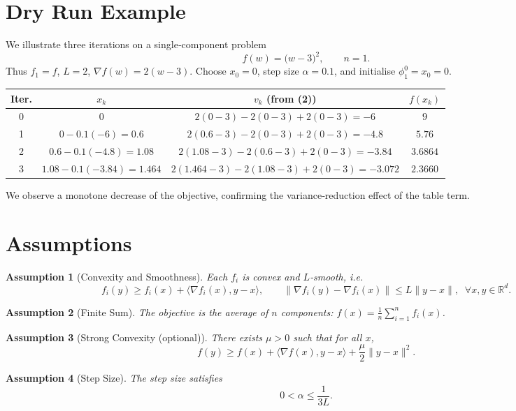 \documentclass[11pt]{article}
\newtheorem{assumption}{Assumption}
\newcommand{\R}{\mathbb{R}}
\begin{document}
\section*{Dry Run Example}
We illustrate three iterations on a single‑component problem 
\[
f(w)=\bigl(w-3\bigr)^{2},\qquad n=1.
\]
Thus $f_{1}=f$, $L=2$, $\nabla f(w)=2(w-3)$.  
Choose $x_{0}=0$, step size $\alpha=0.1$, and initialise $\phi^{0}_{1}=x_{0}=0$.

\begin{center}
\begin{tabular}{c|c|c|c}
\textbf{Iter.} & $x_{k}$ & $v_{k}$ (from (2)) & $f(x_{k})$\\ \hline
0 & $0$ & $2(0-3)-2(0-3)+2(0-3)= -6$ & $9$\\
1 & $0-0.1(-6)=0.6$ & $2(0.6-3)-2(0-3)+2(0-3)= -4.8$ & $5.76$\\
2 & $0.6-0.1(-4.8)=1.08$ & $2(1.08-3)-2(0.6-3)+2(0-3)= -3.84$ & $3.6864$\\
3 & $1.08-0.1(-3.84)=1.464$ & $2(1.464-3)-2(1.08-3)+2(0-3)= -3.072$ & $2.3660$
\end{tabular}
\end{center}
We observe a monotone decrease of the objective, confirming the variance‑reduction effect of the table term.

\section*{Assumptions}
\begin{assumption}[Convexity and Smoothness]\label{as:convex}
Each $f_i$ is convex and $L$‑smooth, i.e.
\[
f_i(y)\ge f_i(x)+\langle\nabla f_i(x),y-x\rangle, \qquad
\|\nabla f_i(y)-\nabla f_i(x)\|\le L\|y-x\|,\;\;\forall x,y\in\R^{d}.
\]
\end{assumption}
\begin{assumption}[Finite Sum]\label{as:finite}
The objective is the average of $n$ components:
$f(x)=\frac1n\sum_{i=1}^{n}f_i(x)$.
\end{assumption}
\begin{assumption}[Strong Convexity (optional)]\label{as:strong}
There exists $\mu>0$ such that for all $x$,
\[
f(y)\ge f(x)+\langle\nabla f(x),y-x\rangle+\frac{\mu}{2}\|y-x\|^{2}.
\]
\end{assumption}
\begin{assumption}[Step Size]\label{as:stepsize}
The step size satisfies 
\[
0<\alpha\le\frac{1}{3L}.
\]
\end{assumption}
\end{document}
